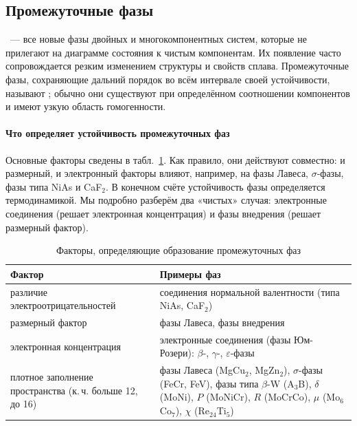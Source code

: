 \subsection{Промежуточные фазы}\label{ssec:intermediate}

~— все новые фазы двойных и многокомпонентных
систем, которые не прилегают на диаграмме состояния к чистым
компонентам. Их появление часто сопровождается резким изменением
структуры и свойств сплава. Промежуточные фазы, сохраняющие дальний
порядок во всём интервале своей устойчивости, называют
; обычно они существуют при
определённом соотношении компонентов и имеют узкую область
гомогенности.

\paragraph{Что определяет устойчивость промежуточных фаз}
Основные факторы сведены в табл.~\ref{tab:inter-factors}. Как правило,
они действуют совместно: и размерный, и электронный факторы влияют,
например, на фазы Лавеса, $\sigma$-фазы, фазы типа NiAs и CaF$_2$. В
конечном счёте устойчивость фазы определяется термодинамикой. Мы
подробно разберём два «чистых» случая: электронные соединения
(решает электронная концентрация) и фазы внедрения (решает размерный
фактор).

\begin{table}[ht]
\centering
\caption{Факторы, определяющие образование промежуточных фаз}
\label{tab:inter-factors}
\small
\begin{tabularx}{\textwidth}{@{}>{\raggedright\arraybackslash}p{42mm}>{\raggedright\arraybackslash}X@{}}
\toprule
Фактор & Примеры фаз \\
\midrule
различие электроотрицательностей & соединения нормальной валентности (типа NiAs, CaF$_2$) \\
размерный фактор & фазы Лавеса, фазы внедрения \\
электронная концентрация & электронные соединения (фазы Юм-Розери): $\beta$-, $\gamma$-, $\varepsilon$-фазы \\
плотное заполнение пространства (к.\,ч. больше 12, до 16) & фазы Лавеса (MgCu$_2$, MgZn$_2$), $\sigma$-фазы (FeCr, FeV), фазы типа $\beta$-W (A$_3$B), $\delta$ (MoNi), $P$ (MoNiCr), $R$ (MoCrCo), $\mu$ (Mo$_6$Co$_7$), $\chi$ (Re$_{24}$Ti$_5$) \\
\bottomrule
\end{tabularx}
\end{table}

